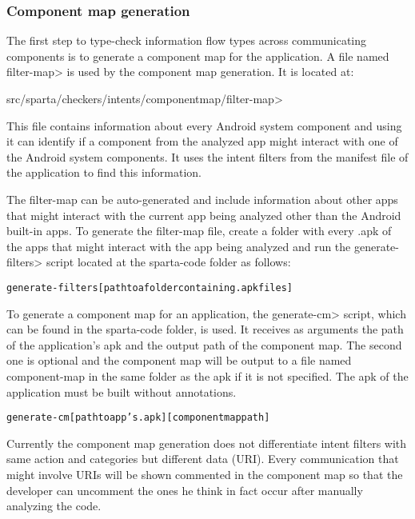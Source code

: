 \subsubsection{Component map generation\label{component-map-generation}}

The first step to type-check information flow types across communicating
components is to generate a component map for the application.
A file named \<filter-map> is used by the component map generation. It is
located at:

\<src/sparta/checkers/intents/componentmap/filter-map>

This file contains
information about every Android system component and using it
\theIntentChecker{} can identify if a component from the analyzed app might 
interact with one of the Android system components. It uses the intent filters
from the manifest file of the application to find this information.

The filter-map can be auto-generated and include information about other
apps that might interact with the current app being analyzed other than the
Android built-in apps. To generate
the filter-map file, create a folder with  every .apk of the apps
that might interact with the app being analyzed and run the \<generate-filters>
 script located at the sparta-code folder as follows:
 
\begin{alltt}
generate-filters [path to a folder containing .apk files]
\end{alltt}

To generate a component map for an application, the \<generate-cm> script, which 
can be found in the sparta-code folder, is used.
It receives as arguments the path of the application's apk and the output
path of the component map. The second one is optional and the component map
will be output to a file named component-map in the same folder as the apk if 
it is not specified. The apk of the application must be built without
annotations.
\begin{alltt}
generate-cm [path to app's .apk] [component map path]
\end{alltt}


Currently the component map generation does not differentiate intent filters
with same action and categories but different data (URI). Every communication
that might involve URIs will be shown commented in the component map so that
the developer can uncomment the ones he think in fact occur after manually
analyzing the code.

